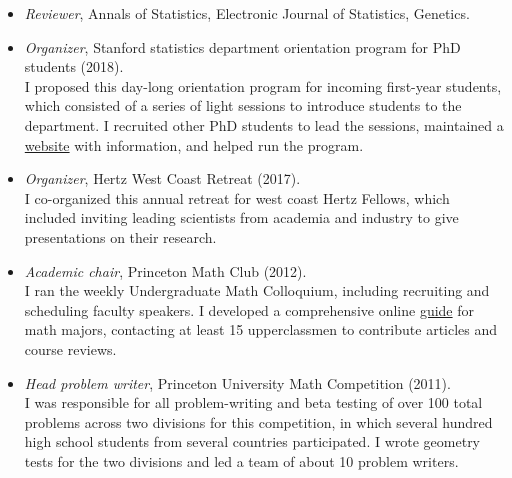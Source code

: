 \documentclass[letterpaper]{article}
\begin{document}
\begin{itemize}\addtolength{\itemsep}{-0.2\baselineskip}
	\item \textit{Reviewer}, Annals of Statistics, Electronic Journal of Statistics, Genetics.
	\item \textit{Organizer}, Stanford statistics department orientation program for PhD students (2018). \\
	I proposed this day-long orientation program for incoming first-year students, which consisted of a series of light sessions to introduce students to the department. I recruited other PhD students to lead the sessions, maintained a \href{http://web.stanford.edu/~ekatsevi/stats_orientation/}{website} with information, and helped run the program. 
	\item \textit{Organizer}, Hertz West Coast Retreat (2017). \\
	I co-organized this annual retreat for west coast Hertz Fellows, which included inviting leading scientists from academia and industry to give presentations on their research. 
	\item \textit{Academic chair}, Princeton Math Club (2012). \\ 
	I ran the weekly Undergraduate Math Colloquium, including recruiting and scheduling faculty speakers. I developed a comprehensive online \href{https://blogs.princeton.edu/mathclub/guide/}{guide} for math majors, contacting at least 15 upperclassmen to contribute articles and course reviews.
	\item \textit{Head problem writer}, Princeton University Math Competition (2011). \\
	I was responsible for all problem-writing and beta testing of over 100 total problems across two divisions for this competition, in which several hundred high school students from several countries participated. I wrote geometry tests for the two divisions and led a team of about 10 problem writers.
\end{itemize}


\end{document}
